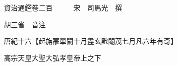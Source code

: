 










 


 
 


 

  
  
  
  
  





  
  
  
  
  
 
  

  

  
  
  



  

 
 

  
   




  

  
  


  　　資治通鑑卷二百　　　宋　司馬光　撰

　　胡三省　音注

　　唐紀十六【起旃蒙單閼十月盡玄黓閹茂七月凡六年有奇】

　　高宗天皇大聖大弘孝皇帝上之下

